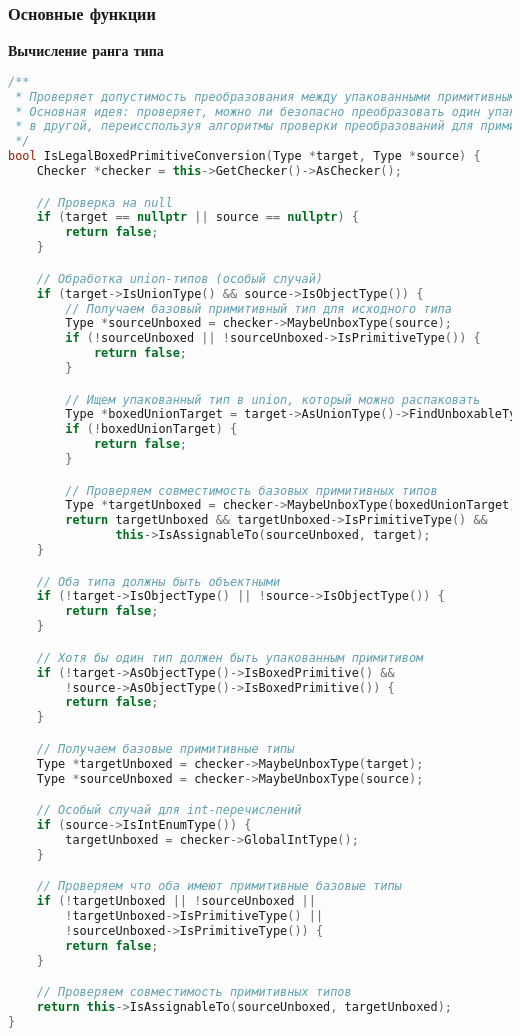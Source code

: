 \subsubsection{Основные функции}
\textbf{Вычисление ранга типа}
\begin{lstlisting}[language=C++,caption=GetTypeRank]
/**
 * Проверяет допустимость преобразования между упакованными примитивными типами.
 * Основная идея: проверяет, можно ли безопасно преобразовать один упакованный тип
 * в другой, переисспользуя алгоритмы проверки преобразований для примитивных типов.
 */
bool IsLegalBoxedPrimitiveConversion(Type *target, Type *source) {
    Checker *checker = this->GetChecker()->AsChecker();

    // Проверка на null
    if (target == nullptr || source == nullptr) {
        return false;
    }

    // Обработка union-типов (особый случай)
    if (target->IsUnionType() && source->IsObjectType()) {
        // Получаем базовый примитивный тип для исходного типа
        Type *sourceUnboxed = checker->MaybeUnboxType(source);
        if (!sourceUnboxed || !sourceUnboxed->IsPrimitiveType()) {
            return false;
        }

        // Ищем упакованный тип в union, который можно распаковать
        Type *boxedUnionTarget = target->AsUnionType()->FindUnboxableType();
        if (!boxedUnionTarget) {
            return false;
        }

        // Проверяем совместимость базовых примитивных типов
        Type *targetUnboxed = checker->MaybeUnboxType(boxedUnionTarget);
        return targetUnboxed && targetUnboxed->IsPrimitiveType() &&
               this->IsAssignableTo(sourceUnboxed, target);
    }

    // Оба типа должны быть объектными
    if (!target->IsObjectType() || !source->IsObjectType()) {
        return false;
    }

    // Хотя бы один тип должен быть упакованным примитивом
    if (!target->AsObjectType()->IsBoxedPrimitive() &&
        !source->AsObjectType()->IsBoxedPrimitive()) {
        return false;
    }

    // Получаем базовые примитивные типы
    Type *targetUnboxed = checker->MaybeUnboxType(target);
    Type *sourceUnboxed = checker->MaybeUnboxType(source);

    // Особый случай для int-перечислений
    if (source->IsIntEnumType()) {
        targetUnboxed = checker->GlobalIntType();
    }

    // Проверяем что оба имеют примитивные базовые типы
    if (!targetUnboxed || !sourceUnboxed ||
        !targetUnboxed->IsPrimitiveType() ||
        !sourceUnboxed->IsPrimitiveType()) {
        return false;
    }

    // Проверяем совместимость примитивных типов
    return this->IsAssignableTo(sourceUnboxed, targetUnboxed);
}
\end{lstlisting}
